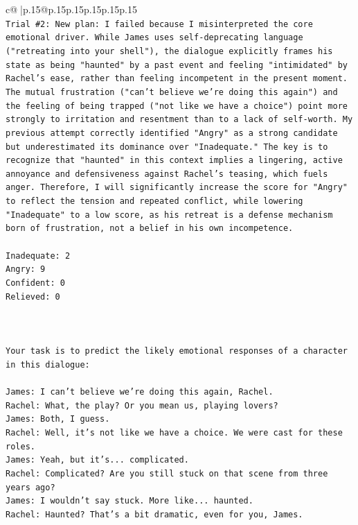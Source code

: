 \documentclass{article}
\begin{document}
{\begin{supertabular}{c@{$\;$}|p{.15\linewidth}@{}p{.15\linewidth}p{.15\linewidth}p{.15\linewidth}p{.15\linewidth}p{.15\linewidth}}
{{{\\ 
\texttt{Trial \#2: New plan: I failed because I misinterpreted the core emotional driver. While James uses self{-}deprecating language ("retreating into your shell"), the dialogue explicitly frames his state as being "haunted" by a past event and feeling "intimidated" by Rachel's ease, rather than feeling incompetent in the present moment. The mutual frustration ("can't believe we're doing this again") and the feeling of being trapped ("not like we have a choice") point more strongly to irritation and resentment than to a lack of self{-}worth. My previous attempt correctly identified "Angry" as a strong candidate but underestimated its dominance over "Inadequate." The key is to recognize that "haunted" in this context implies a lingering, active annoyance and defensiveness against Rachel's teasing, which fuels anger. Therefore, I will significantly increase the score for "Angry" to reflect the tension and repeated conflict, while lowering "Inadequate" to a low score, as his retreat is a defense mechanism born of frustration, not a belief in his own incompetence.} \\
\\ 
\texttt{Inadequate: 2} \\
\texttt{Angry: 9} \\
\texttt{Confident: 0} \\
\texttt{Relieved: 0} \\
\\ 
\\ 
\\ 
\texttt{Your task is to predict the likely emotional responses of a character in this dialogue:} \\
\\ 
\texttt{James: I can't believe we're doing this again, Rachel. } \\
\texttt{Rachel: What, the play? Or you mean us, playing lovers?} \\
\texttt{James: Both, I guess. } \\
\texttt{Rachel: Well, it's not like we have a choice. We were cast for these roles. } \\
\texttt{James: Yeah, but it's... complicated.} \\
\texttt{Rachel: Complicated? Are you still stuck on that scene from three years ago?} \\
\texttt{James: I wouldn't say stuck. More like... haunted.} \\
\texttt{Rachel: Haunted? That's a bit dramatic, even for you, James.} \\
}}}
\end{supertabular}}
\end{document}
